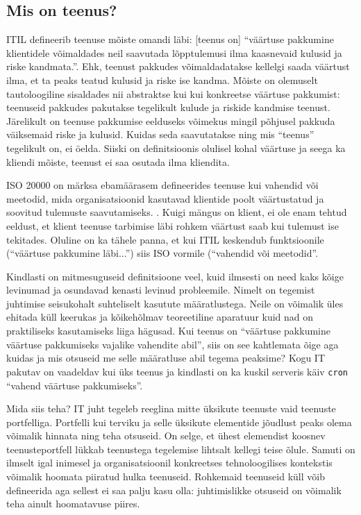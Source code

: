\subsection{Mis on teenus?}
ITIL defineerib teenuse mõiste omandi läbi: [teenus on] \enquote{väärtuse pakkumine klientidele võimaldades neil saavutada lõpptulemusi ilma kaasnevaid kulusid ja riske kandmata.}\cite{itil}. Ehk, teenust pakkudes võimaldadatakse kellelgi saada väärtust ilma, et ta peaks teatud kulusid ja riske ise kandma. Mõiste on olemuselt tautoloogiline sisaldades nii abstraktse kui kui konkreetse väärtuse pakkumist: teenuseid pakkudes pakutakse tegelikult kulude ja riskide kandmise teenust. Järelikult on teenuse pakkumise eelduseks võimekus mingil põhjusel pakkuda väiksemaid riske ja kulusid. Kuidas seda saavutatakse ning mis \enquote{teenus} tegelikult on, ei öelda. Siiski on definitsioonis olulisel kohal väärtuse ja seega ka kliendi mõiste, teenust ei saa osutada ilma kliendita.

ISO 20000 on märksa ebamäärasem defineerides teenuse kui vahendid või meetodid, mida organisatsioonid kasutavad klientide poolt väärtustatud ja soovitud tulemuste saavutamiseks. \cite{iso20000}. Kuigi mängus on klient, ei ole enam tehtud eeldust, et klient teenuse tarbimise läbi rohkem väärtust saab kui tulemust ise tekitades. Oluline on ka tähele panna, et kui ITIL keskendub funktsioonile (\enquote{väärtuse pakkumine läbi...}) siis ISO vormile (\enquote{vahendid või meetodid}. 

Kindlasti on mitmesuguseid definitsioone veel, kuid ilmsesti on need kaks kõige levinumad ja osundavad kenasti levinud probleemile. Nimelt on tegemist juhtimise seisukohalt suhteliselt kasutute määratlustega. Neile on võimalik üles ehitada küll keerukas ja kõikehõlmav teoreetiline aparatuur kuid nad on praktiliseks kasutamiseks liiga hägusad. Kui teenus on \enquote{väärtuse pakkumine väärtuse pakkumiseks vajalike vahendite abil}, siis on see kahtlemata õige aga kuidas ja mis otsuseid me selle määratluse abil tegema peaksime? Kogu IT pakutav on vaadeldav kui üks teenus ja kindlasti on ka kuskil serveris käiv \texttt{cron} \enquote{vahend väärtuse pakkumiseks}. 

Mida siis teha? IT juht tegeleb reeglina mitte üksikute teenuste vaid teenuste portfelliga. Portfelli kui terviku ja selle üksikute elementide jõudlust peaks olema võimalik hinnata ning teha otsuseid. On selge, et ühest elemendist koosnev teenusteportfell lükkab teenustega tegelemise lihtsalt kellegi teise õlule. Samuti on ilmselt igal inimesel ja organisatsioonil konkreetses tehnoloogilises kontekstis võimalik hoomata piiratud hulka teenuseid. Rohkemaid teenuseid küll võib defineerida aga sellest ei saa palju kasu olla: juhtimislikke otsuseid on võimalik teha ainult hoomatavuse piires. 

